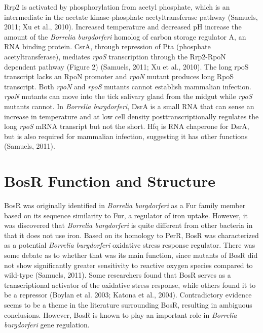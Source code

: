 \documentclass[12pt,twoside]{reedthesis}
\begin{document}
		
		Rrp2 is activated by phosphorylation from acetyl phosphate, which is an intermediate in the acetate kinase-phosphate acetyltransferase pathway (Samuels, 2011; Xu et al., 2010). Increased temperature and decreased pH increase the amount of the \textit{Borrelia burgdorferi} homolog of carbon storage regulator A, an RNA binding protein. CsrA, through repression of Pta (phosphate acetyltransferase), mediates \textit{rpoS} transcription through the Rrp2-RpoN dependent pathway (Figure 2) (Samuels, 2011; Xu et al., 2010). The long rpoS transcript lacks an RpoN promoter and \textit{rpoN} mutant produces long RpoS transcript. Both \textit{rpoN} and \textit{rpoS} mutants cannot establish mammalian infection. \textit{rpoN} mutants can move into the tick salivary gland from the midgut while \textit{rpoS} mutants cannot. In \textit{Borrelia burgdorferi}, DsrA is a small RNA that can sense an increase in temperature and at low cell density posttranscriptionally regulates the long \textit{rpoS} mRNA transript but not the short. Hfq is RNA chaperone for DsrA, but is also required for mammalian infection, suggesting it has other functions (Samuels, 2011). 
		
		\section*{BosR Function and Structure}
		
	  BosR was originally identified in \textit{Borrelia burgdorferi} as a Fur family member based on its sequence similarity to Fur, a regulator of iron uptake. However, it was discovered that \textit{Borrelia burgdorferi} is quite different from other bacteria in that it does not use iron. Based on its homology to PerR, BosR was characterized as a potential \textit{Borrelia burgdorferi} oxidative stress response regulator. There was some debate as to whether that was its main function, since mutants of BosR did not show significantly greater sensitivity to reactive oxygen species compared to wild-type (Samuels, 2011). Some researchers found that BosR serves as a transcriptional activator of the oxidative stress response, while others found it to be a repressor (Boylan et al. 2003;  Katona et al., 2004). Contradictory evidence seems to be a theme in the literature surrounding BosR, resulting in ambiguous conclusions. However, BosR is known to play an important role in \textit{Borrelia burgdorferi} gene regulation. 
		
\end{document}
